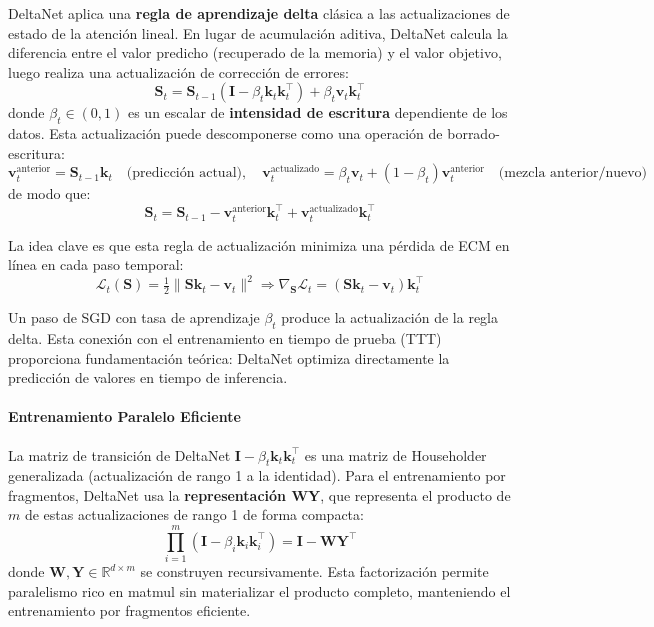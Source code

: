 DeltaNet \citep{yang_deltanet_2024} aplica una \textbf{regla de aprendizaje delta} clásica a las actualizaciones de estado de la atención lineal. En lugar de acumulación aditiva, DeltaNet calcula la diferencia entre el valor predicho (recuperado de la memoria) y el valor objetivo, luego realiza una actualización de corrección de errores:
\[
\mathbf{S}_t = \mathbf{S}_{t-1}(\mathbf{I} - \beta_t \mathbf{k}_t \mathbf{k}_t^\top) + \beta_t \mathbf{v}_t \mathbf{k}_t^\top
\]
donde $\beta_t \in (0,1)$ es un escalar de \textbf{intensidad de escritura} dependiente de los datos. Esta actualización puede descomponerse como una operación de borrado-escritura:
{\small
\[
\mathbf{v}_t^\text{anterior} = \mathbf{S}_{t-1} \mathbf{k}_t \quad \text{(predicción actual)}, \quad
\mathbf{v}_t^\text{actualizado} = \beta_t \mathbf{v}_t + (1-\beta_t)\mathbf{v}_t^\text{anterior} \quad \text{(mezcla anterior/nuevo)}
\]
}
de modo que:
\[
\mathbf{S}_t = \mathbf{S}_{t-1} - \mathbf{v}_t^\text{anterior}\mathbf{k}_t^\top + \mathbf{v}_t^\text{actualizado}\mathbf{k}_t^\top
\]

La idea clave es que esta regla de actualización minimiza una pérdida de ECM en línea en cada paso temporal:
\[
\mathcal{L}_t(\mathbf{S}) = \tfrac{1}{2}\|\mathbf{S}\mathbf{k}_t - \mathbf{v}_t\|^2 \Rightarrow \nabla_{\mathbf{S}} \mathcal{L}_t = (\mathbf{S}\mathbf{k}_t - \mathbf{v}_t)\mathbf{k}_t^\top
\]

Un paso de SGD con tasa de aprendizaje $\beta_t$ produce la actualización de la regla delta. Esta conexión con el entrenamiento en tiempo de prueba (TTT) proporciona fundamentación teórica: DeltaNet optimiza directamente la predicción de valores en tiempo de inferencia.

\paragraph{Entrenamiento Paralelo Eficiente}

La matriz de transición de DeltaNet $\mathbf{I} - \beta_t \mathbf{k}_t \mathbf{k}_t^\top$ es una matriz de Householder generalizada (actualización de rango 1 a la identidad). Para el entrenamiento por fragmentos, DeltaNet usa la \textbf{representación WY}, que representa el producto de $m$ de estas actualizaciones de rango 1 de forma compacta:
\[
\prod_{i=1}^{m} (\mathbf{I} - \beta_i \mathbf{k}_i \mathbf{k}_i^\top) = \mathbf{I} - \mathbf{W}\mathbf{Y}^\top
\]
donde $\mathbf{W}, \mathbf{Y} \in \mathbb{R}^{d \times m}$ se construyen recursivamente. Esta factorización permite paralelismo rico en matmul sin materializar el producto completo, manteniendo el entrenamiento por fragmentos eficiente.


